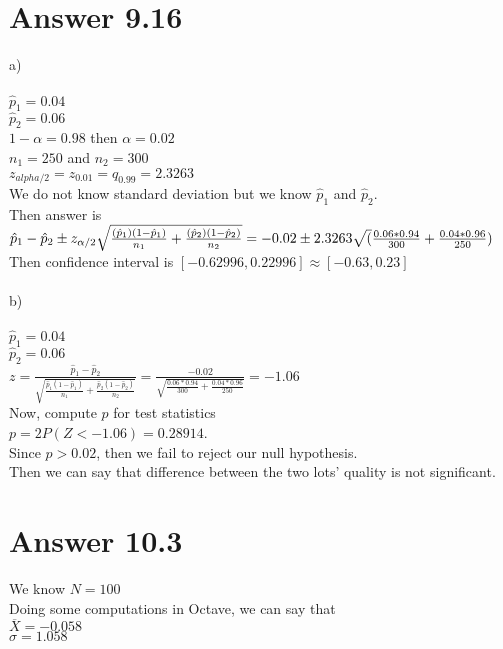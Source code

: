 \documentclass[12pt]{article}
\begin{document}
\section*{Answer 9.16}
a)\\ \\
$\hat p_1 = 0.04$\\
$\hat p_2 = 0.06$\\
$1 - \alpha = 0.98$ then $\alpha = 0.02$\\
$n_1 = 250$ and $n_2 = 300$\\
$z_{alpha/2} = z_{0.01} = q_{0.99} = 2.3263$\\
We do not know standard deviation but we know $\hat p_1$ and $\hat p_2$.\\
Then answer is $\hat p_1 - \hat p_2 \pm z_{\alpha /2} \sqrt{\frac{(\hat p_1)(1-\hat p_1)}{n_1} + \frac{(\hat p_2)(1-\hat p_2)}{n_2}}\\ = -0.02 \pm 2.3263 \sqrt(\frac{0.06 * 0.94}{300} + \frac{0.04*0.96}{250})$\\

Then confidence interval is $[-0.62996, 0.22996] \approx [-0.63, 0.23]$ \\ \\ 

b)\\ \\
$\hat p_1 = 0.04$\\
$\hat p_2 = 0.06$\\

$z = \frac{\hat p_1 - \hat p_2}{\sqrt{\frac{\hat p_1(1 - \hat p_1)}{n_1} + \frac{\hat p_2(1 - \hat p_2)}{n_2}}} = \frac{-0.02}{\sqrt{\frac{0.06 * 0.94}{300} + \frac{0.04 * 0.96}{250}}} = -1.06$\\

Now, compute $p$ for test statistics\\
$p = 2P(Z < -1.06) = 0.28914$.\\

Since $p>0.02$, then we fail to reject our null hypothesis.\\
Then we can say that difference between the two lots' quality is not significant.

\section*{Answer 10.3}

We know $N = 100$\\
Doing some computations in Octave, we can say that\\
$\overline X = -0.058$\\
$\sigma = 1.058$\\
\end{document}
